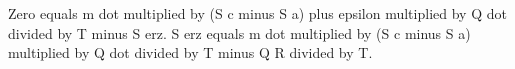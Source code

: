 Zero equals m dot multiplied by (S c minus S a) plus epsilon multiplied by Q dot divided by T minus S erz.  
S erz equals m dot multiplied by (S c minus S a) multiplied by Q dot divided by T minus Q R divided by T.
